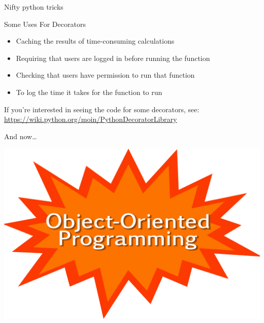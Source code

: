 \documentclass[aspectratio=149, handout] {beamer}
\begin{document}
\begin{frame}[fragile]{Nifty python tricks}

  {\large Some Uses For Decorators}


  \begin{itemize}
    \item Caching the results of time-consuming calculations
    \item Requiring that users are logged in before running the function
    \item Checking that users have permission to run that function
    \item To log the time it takes for the function to run
  \end{itemize}

  If you're interested in seeing the code for some decorators,
  see: \url{https://wiki.python.org/moin/PythonDecoratorLibrary}

\end{frame}





{
\begin{frame}{And now\dots}
  \vspace{-5ex} \pause
  \begin{center}  
    \includegraphics[scale=.6]{starburstsf}
  \end{center}
\end{frame}
}
\end{document}

